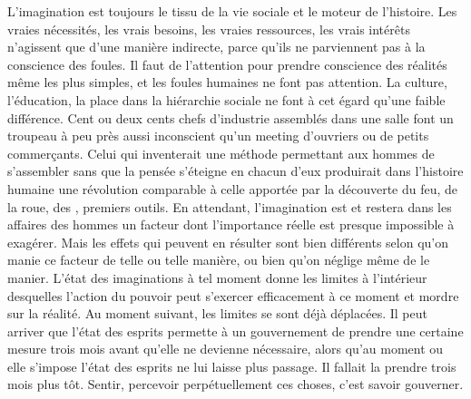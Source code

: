 \documentclass[french,twoside]{book} %
\begin{document}
L'imagination est toujours le tissu de la vie sociale et le moteur de l'histoire. Les vraies nécessités, les vrais besoins, les vraies ressources, les vrais intérêts n'agissent que d'une manière indirecte, parce qu'ils ne parvien­nent pas à la conscience des foules. Il faut de l'attention pour prendre conscience des réalités même les plus simples, et les foules humaines ne font pas attention. La culture, l'éducation, la place dans la hiérarchie sociale ne font à cet égard qu'une faible différence. Cent ou deux cents chefs d'industrie assemblés dans une salle font un troupeau à peu près aussi inconscient qu'un meeting d'ouvriers ou de petits commerçants. Celui qui inventerait une méthode permettant aux hommes de s'assembler sans que la pensée s'éteigne en chacun d'eux produirait dans l'histoire humaine une révolution comparable à celle apportée par la découverte du feu, de la roue, des , premiers outils. En attendant, l'imagination est et restera dans les affaires des hommes un facteur dont l'importance réelle est presque impossible à exagérer. Mais les effets qui peuvent en résulter sont bien différents selon qu'on manie ce facteur de telle ou telle manière, ou bien qu'on néglige même de le manier. L'état des imaginations à tel moment donne les limites à l'intérieur desquelles l'action du pouvoir peut s'exercer efficacement à ce moment et mordre sur la réalité. Au moment suivant, les limites se sont déjà déplacées. Il peut arriver que l'état des esprits permette à un gouvernement de prendre une certaine mesure trois mois avant qu'elle ne devienne nécessaire, alors qu'au moment ou elle s’impose l'état des esprits ne lui laisse plus passage. Il fallait la prendre trois mois plus tôt. Sentir, percevoir perpétuellement ces choses, c'est savoir gouverner.\par
\end{document}
